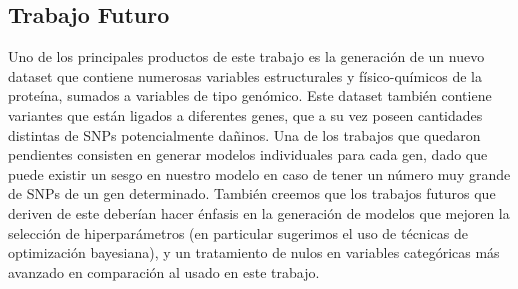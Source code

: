 \subsection{Trabajo Futuro}

Uno de los principales productos de este trabajo es la generación de un nuevo dataset que contiene numerosas variables estructurales y físico-químicos de la proteína, sumados a variables de tipo genómico. Este dataset también contiene variantes que están ligados a diferentes genes, que a su vez poseen cantidades distintas de SNPs potencialmente dañinos. Una de los trabajos que quedaron pendientes consisten en generar modelos individuales para cada gen, dado que puede existir un sesgo en nuestro modelo en caso de tener un número muy grande de SNPs de un gen determinado. También creemos que los trabajos futuros que deriven de este deberían hacer énfasis en la generación de modelos que mejoren la selección de hiperparámetros (en particular sugerimos el uso de técnicas de optimización bayesiana), y un tratamiento de nulos en variables categóricas más avanzado en comparación al usado en este trabajo. 

